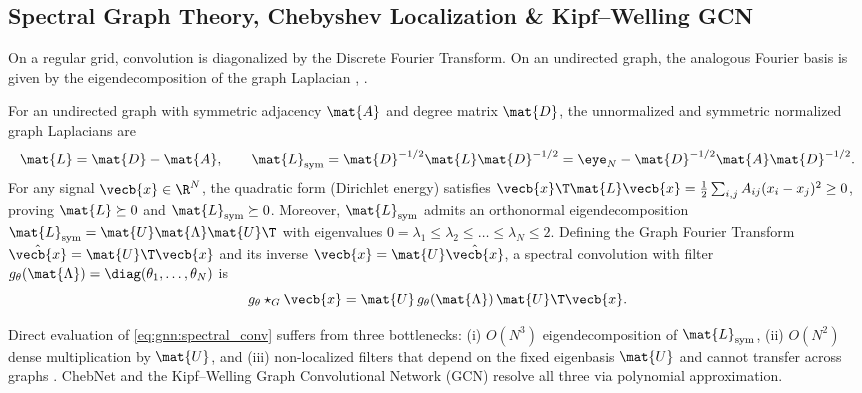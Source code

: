 \documentclass[../../../../master.tex]{subfiles}
\begin{document}
\subsection{Spectral Graph Theory, Chebyshev Localization \& Kipf--Welling GCN}
\label{sec:gnn:spectral}

On a regular grid, convolution is diagonalized by the Discrete Fourier Transform. On an undirected graph, the analogous Fourier basis is given by the eigendecomposition of the graph Laplacian , .

\begin{coremath}
\label{box:gnn:laplacian}
For an undirected graph with symmetric adjacency $\mat{A}$ and degree matrix $\mat{D}$, the unnormalized and symmetric normalized graph Laplacians are
\begin{equation}
  \mat{L} = \mat{D} - \mat{A}, \qquad \mat{L}_{\mathrm{sym}} = \mat{D}^{-1/2}\mat{L}\mat{D}^{-1/2} = \eye_N - \mat{D}^{-1/2}\mat{A}\mat{D}^{-1/2}. \label{eq:gnn:laplacians}
\end{equation}
For any signal $\vecb{x} \in \R^N$, the quadratic form (Dirichlet energy) satisfies $\vecb{x}\T\mat{L}\vecb{x} = \frac{1}{2}\sum_{i,j} A_{ij}(x_i - x_j)^2 \ge 0$, proving $\mat{L} \succeq 0$ and $\mat{L}_{\mathrm{sym}} \succeq 0$. Moreover, $\mat{L}_{\mathrm{sym}}$ admits an orthonormal eigendecomposition $\mat{L}_{\mathrm{sym}} = \mat{U}\mat{\Lambda}\mat{U}\T$ with eigenvalues $0 = \lambda_1 \le \lambda_2 \le \dots \le \lambda_N \le 2$. Defining the Graph Fourier Transform $\hat{\vecb{x}} = \mat{U}\T\vecb{x}$ and its inverse $\vecb{x} = \mat{U}\hat{\vecb{x}}$, a spectral convolution with filter $g_\theta(\mat{\Lambda}) = \diag(\theta_1,\dots,\theta_N)$ is
\begin{equation}
  g_\theta \star_G \vecb{x} = \mat{U}\, g_\theta(\mat{\Lambda})\, \mat{U}\T \vecb{x}. \label{eq:gnn:spectral_conv}
\end{equation}
\end{coremath}

Direct evaluation of \eqref{eq:gnn:spectral_conv} suffers from three bottlenecks: (i) $O(N^3)$ eigendecomposition of $\mat{L}_{\mathrm{sym}}$, (ii) $O(N^2)$ dense multiplication by $\mat{U}$, and (iii) non-localized filters that depend on the fixed eigenbasis $\mat{U}$ and cannot transfer across graphs . ChebNet and the Kipf--Welling Graph Convolutional Network (GCN) resolve all three via polynomial approximation.
\end{document}
